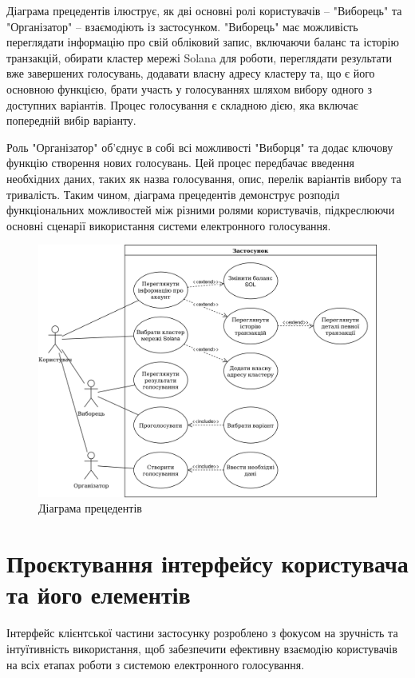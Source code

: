 \documentclass[14pt]{extreport}
\begin{document}
Діаграма прецедентів ілюструє, як дві основні ролі користувачів – "Виборець" та "Організатор" – взаємодіють із застосунком. "Виборець" має можливість переглядати інформацію про свій обліковий запис, включаючи баланс та історію транзакцій, обирати кластер мережі Solana для роботи, переглядати результати вже завершених голосувань, додавати власну адресу кластеру та, що є його основною функцією, брати участь у голосуваннях шляхом вибору одного з доступних варіантів. Процес голосування є складною дією, яка включає попередній вибір варіанту.

Роль "Організатор" об'єднує в собі всі можливості "Виборця" та додає ключову функцію створення нових голосувань. Цей процес передбачає введення необхідних даних, таких як назва голосування, опис, перелік варіантів вибору та тривалість. Таким чином, діаграма прецедентів демонструє розподіл функціональних можливостей між різними ролями користувачів, підкреслюючи основні сценарії використання системи електронного голосування.

  \begin{figure}[H]
    \centering
    \includegraphics[scale=0.18]{UMLUseCase}
    \caption{Діаграма прецедентів}
    \label{fig:UMLUseCase}
  \end{figure}
  
  \section{Проєктування інтерфейсу користувача та його елементів}
  
  Інтерфейс клієнтської частини застосунку розроблено з фокусом на зруч\-ність та інтуїтивність використання, щоб забезпечити ефективну взаємодію користувачів на всіх етапах роботи з системою електронного голосування.
\end{document}
